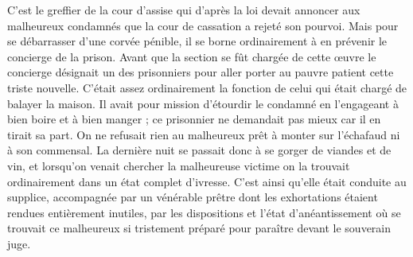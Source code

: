 C'est le greffier de la cour d'assise qui d'après la loi devait annoncer aux malheureux condamnés que la cour de cassation a rejeté son pourvoi. Mais pour se débarrasser d'une corvée pénible, il se borne ordinairement à en prévenir le concierge de la prison. Avant que la section se fût chargée de cette œuvre le concierge désignait un des prisonniers pour aller porter au pauvre patient cette triste nouvelle. C'était assez ordinairement la fonction de celui qui était chargé de balayer la maison. Il avait pour mission d'étourdir le condamné en l'engageant à bien boire et à bien manger ; ce prisonnier ne demandait pas mieux car il en tirait sa part. On ne refusait rien au malheureux prêt à monter sur l'échafaud ni à son commensal. La dernière nuit se passait donc à se gorger de viandes et de vin, et lorsqu'on venait chercher la malheureuse victime on la trouvait ordinairement dans un état complet d'ivresse. C'est ainsi qu'elle était conduite au supplice, accompagnée par un vénérable prêtre dont les exhortations étaient rendues entièrement inutiles, par les dispositions et l'état d'anéantissement où se trouvait ce malheureux si tristement préparé pour paraître devant le souverain juge.

